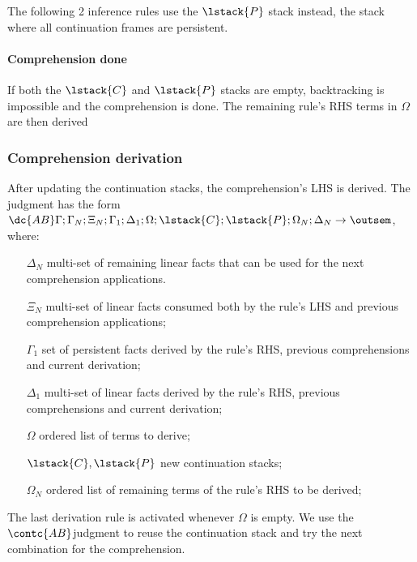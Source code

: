 The following 2 inference rules use the $\lstack{P}$ stack instead, the stack where all
continuation frames are persistent.



\paragraph{Comprehension done}

If both the $\lstack{C}$ and $\lstack{P}$ stacks are empty, backtracking is
impossible and the comprehension is done. The remaining rule's RHS terms in
$\Omega$ are then derived



\subsubsection{Comprehension derivation}

After updating the continuation stacks, the comprehension's LHS is derived. The
judgment has the form $\dc{AB} \Gamma; \Gamma_N; \Xi_N; \Gamma_1; \Delta_1;
\Omega; \lstack{C}; \lstack{P}; \Omega_N; \Delta_N \rightarrow \outsem$, where:

\begin{enumerate}
   \item[$\Delta_N$] multi-set of remaining linear facts that can be used for
   the next comprehension applications.

   \item[$\Xi_N$] multi-set of linear facts consumed both by the rule's LHS and
      previous comprehension applications;

   \item[$\Gamma_1$] set of persistent facts derived by the rule's RHS, previous
      comprehensions and current derivation;

   \item[$\Delta_1$] multi-set of linear facts derived by the rule's RHS,
      previous comprehensions and current derivation;

   \item[$\Omega$] ordered list of terms to derive;
   \item[$\lstack{C}, \lstack{P}$] new continuation stacks;

   \item[$\Omega_N$] ordered list of remaining terms of the rule's RHS to be
      derived;

\end{enumerate}



The last derivation rule is activated whenever $\Omega$ is empty. We use the
$\contc{AB}$judgment to reuse the continuation stack
and try the next combination for the comprehension.


